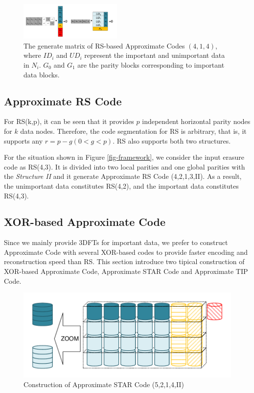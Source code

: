 \documentclass[sigconf]{acmart}
\begin{document}
\begin{figure}[htb]
\centering
\includegraphics[width=0.45\textwidth]{photo/AP-RS-43.pdf}
\caption{The generate matrix of RS-based Approximate Codes $(4,1,4)$, where $ID_i$ and $UD_i$ represent the important and unimportant data in $N_i$. $G_0$ and $G_1$ are the parity blocks corresponding to important data blocks.}
\label{fig-ap-rs}
\end{figure}
\fi

\subsection{Approximate RS Code}
For RS(k,p), it can be seen that it provides $p$ independent horizontal parity nodes for $k$ data nodes. Therefore, the code segmentation for RS is arbitrary, that is, it supports any $r=p-g(0<g<p)$. RS also supports both two structures. 

For the situation shown in Figure \ref{fig-framework}, we consider the input erasure code as RS(4,3). It is divided into two local parities and one global parities with the \emph{Structure II} and it generate Approximate RS Code (4,2,1,3,II).
As a result, the unimportant data constitutes RS(4,2), and the important data constitutes RS(4,3).


\subsection{XOR-based Approximate Code}
Since we mainly provide 3DFTs for important data, we prefer to construct Approximate Code with several XOR-based codes to provide faster encoding and reconstruction speed than RS. This section introduce two tipical construction of XOR-based Approximate Code, Approximate STAR Code and Approximate TIP Code.

\begin{figure}[ht]
\centering
\includegraphics[width=0.7\linewidth]{photo/AP-5214.pdf}
\caption{Construction of Approximate STAR Code (5,2,1,4,II)}
\label{fig-ap-5214}
\end{figure}
\end{document}

